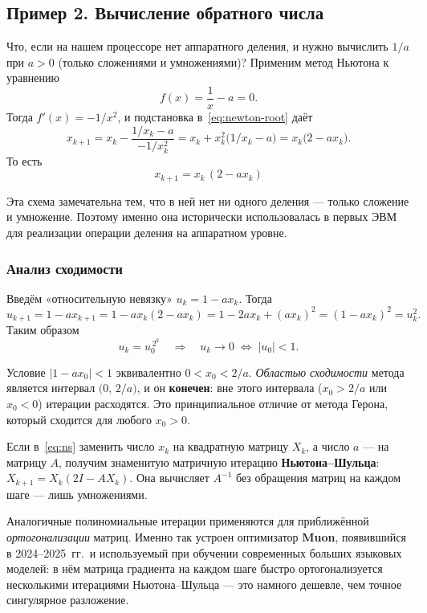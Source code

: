 \subsection{Пример 2. Вычисление обратного числа}

Что, если на нашем процессоре нет аппаратного деления, и нужно
вычислить $1/a$ при $a>0$ (только сложениями и умножениями)?
Применим метод Ньютона к уравнению
\[
f(x)=\dfrac{1}{x}-a=0.
\]
Тогда $f'(x)=-1/x^{2}$, и подстановка в~\eqref{eq:newton-root} даёт
\[
x_{k+1}=x_k-\dfrac{1/x_k-a}{-1/x_k^{2}}
       =x_k+x_k^{2}\bigl(1/x_k-a\bigr)
       =x_k\bigl(2-a x_k\bigr).
\]
То есть
\begin{equation}\label{eq:ns}
\boxed{\;x_{k+1}=x_k\,(2-a x_k)\;}
\end{equation}

Эта схема замечательна тем, что в ней нет ни одного деления — только
сложение и умножение. Поэтому именно она исторически использовалась
в первых ЭВМ для реализации операции деления на аппаратном уровне.

\subsubsection*{Анализ сходимости}

Введём «относительную невязку» $u_k=1-a x_k$. Тогда
\[
u_{k+1}=1-a x_{k+1}=1-a x_k(2-ax_k)=1-2 a x_k+(a x_k)^{2}=(1-a x_k)^{2}=u_k^{2}.
\]
Таким образом
\begin{equation}\label{eq:ns-error}
u_k=u_0^{\,2^{k}}\quad\Longrightarrow\quad u_k\to 0\;\Leftrightarrow\;|u_0|<1.
\end{equation}

Условие $|1-a x_0|<1$ эквивалентно $0<x_0<2/a$. \emph{Областью
сходимости} метода является интервал $\bigl(0,\,2/a\bigr)$, и
он \textbf{конечен}: вне этого интервала ($x_0>2/a$ или $x_0<0$)
итерации расходятся. Это принципиальное отличие от метода Герона,
который сходится для любого $x_0>0$.

\begin{notebox}[title={Метод Ньютона--Шульца и оптимизатор Muon}]
Если в~\eqref{eq:ns} заменить число $x_k$ на квадратную матрицу $X_k$,
а число $a$ — на матрицу $A$, получим знаменитую матричную итерацию
\textbf{Ньютона--Шульца}: $X_{k+1}=X_k(2I-A X_k)$. Она вычисляет
$A^{-1}$ без обращения матриц на каждом шаге — лишь умножениями.

Аналогичные полиномиальные итерации применяются для приближённой
\emph{ортогонализации} матриц. Именно так устроен оптимизатор
\textbf{Muon}, появившийся в 2024–2025~гг.\ и используемый при
обучении современных больших языковых моделей: в нём матрица
градиента на каждом шаге быстро ортогонализуется несколькими
итерациями Ньютона--Шульца — это намного дешевле, чем точное
сингулярное разложение.
\end{notebox}

